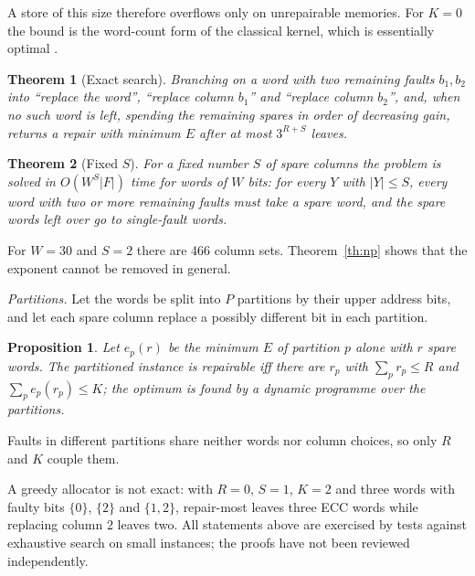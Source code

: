 \documentclass[conference]{IEEEtran}
\newtheorem{theorem}{Theorem}
\newtheorem{proposition}{Proposition}
\begin{document}
A store of this size therefore overflows only on unrepairable memories. For $K=0$ the bound is the
word-count form of the classical kernel, which is essentially optimal \cite{jansen2016}.

\begin{theorem}[Exact search]\label{th:search}
Branching on a word with two remaining faults $b_1,b_2$ into ``replace the word'', ``replace column
$b_1$'' and ``replace column $b_2$'', and, when no such word is left, spending the remaining spares in
order of decreasing gain, returns a repair with minimum $E$ after at most $3^{R+S}$ leaves.
\end{theorem}

\begin{theorem}[Fixed $S$]\label{th:enum}
For a fixed number $S$ of spare columns the problem is solved in $O(W^S|F|)$ time for words of $W$
bits: for every $Y$ with $|Y|\le S$, every word with two or more remaining faults must take a spare
word, and the spare words left over go to single-fault words.
\end{theorem}

For $W=30$ and $S=2$ there are 466 column sets. Theorem~\ref{th:np} shows that the exponent cannot be
removed in general.

\emph{Partitions.} Let the words be split into $P$ partitions by their upper address bits, and let
each spare column replace a possibly different bit in each partition.

\begin{proposition}\label{prop:dp}
Let $e_p(r)$ be the minimum $E$ of partition $p$ alone with $r$ spare words. The partitioned instance
is repairable iff there are $r_p$ with $\sum_p r_p\le R$ and $\sum_p e_p(r_p)\le K$; the optimum is
found by a dynamic programme over the partitions.
\end{proposition}
Faults in different partitions share neither words nor column choices, so only $R$ and $K$ couple
them.

A greedy allocator is not exact: with $R=0$, $S=1$, $K=2$ and three words with faulty bits $\{0\}$,
$\{2\}$ and $\{1,2\}$, repair-most leaves three ECC words while replacing column 2 leaves two. All
statements above are exercised by tests against exhaustive search on small instances; the proofs have
not been reviewed independently.
\end{document}
